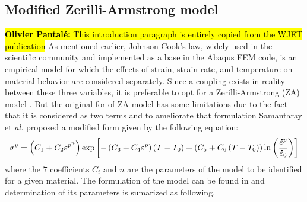 \documentclass[twoside,english,1p,final,sort&compress]{elsarticle}
\makeatletter
\theoremstyle{plain}
\newcommand{\mdot}[1]{\accentset{\mbox{\bfseries .}}{#1}}
\newcommand*{\eal}{et \emph{al.}\@\xspace}
\DeclareRobustCommand{\OP}[1]{ {\begingroup\sethlcolor{VWyellow}\textcolor{red}{\hl{\textbf{Olivier Pantal\'e:} #1}}\endgroup} }
\makeatother
\begin{document}
\subsection{Modified Zerilli-Armstrong model\label{sec:MZA}}
\OP{This introduction paragraph is entirely copied from the WJET publication}
As mentioned earlier, Johnson-Cook's law, widely used in the scientific community and implemented as a base in the Abaqus FEM code, is an empirical model for which the effects of strain, strain rate, and temperature on material behavior are considered separately.
Since a coupling exists in reality between these three variables, it is preferable to opt for a Zerilli-Armstrong (ZA) model \cite{Hull-2011}.
But the original for of ZA model has some limitations due to the fact that it is considered as two terms and to ameliorate that formulation Samantaray \eal \cite{Samantaray-2009} proposed a modified form given by the following equation:
\begin{equation}
\label{eq:MZA-model}
\sigma^y = \left(C_{1}+C_{2}\varepsilon^{p^n}\right) \exp\left[-\left(C_{3}+C_{4}\varepsilon^p\right)\left(T-T_0\right) + \left(C_{5}+C_{6}\left(T-T_0\right)\right)\ln\left( \frac{\mdot\varepsilon^p}{\mdot{\varepsilon}_0}\right)\right]
\end{equation}
where the $7$ coefficients $C_i$ and $n$ are the parameters of the model to be identified for a given material. The formulation of the model can be found in \cite{Samantaray-2009} and determination of its parameters is sumarized as following.
\end{document}

